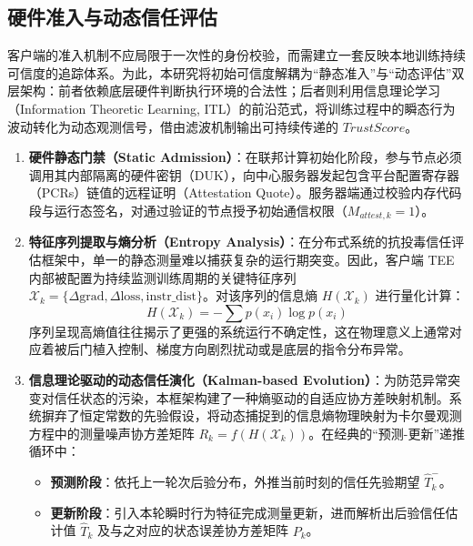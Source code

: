 \documentclass[11pt, a4paper, UTF8, fontset=fandol]{ctexart}
\begin{document}
\subsection{硬件准入与动态信任评估}
客户端的准入机制不应局限于一次性的身份校验，而需建立一套反映本地训练持续可信度的追踪体系。为此，本研究将初始可信度解耦为“静态准入”与“动态评估”双层架构：前者依赖底层硬件判断执行环境的合法性；后者则利用信息理论学习（Information Theoretic Learning, ITL）的前沿范式\cite{chen2017maximum}，将训练过程中的瞬态行为波动转化为动态观测信号，借由滤波机制输出可持续传递的 $TrustScore$。

\begin{enumerate}
    \item \textbf{硬件静态门禁（Static Admission）}：在联邦计算初始化阶段，参与节点必须调用其内部隔离的硬件密钥（DUK），向中心服务器发起包含平台配置寄存器（PCRs）链值的远程证明（Attestation Quote）。服务器端通过校验内存代码段与运行态签名，对通过验证的节点授予初始通信权限（$M_{attest,k}=1$）。
    \item \textbf{特征序列提取与熵分析（Entropy Analysis）}：在分布式系统的抗投毒信任评估框架中\cite{li2026multidimensional}，单一的静态测量难以捕获复杂的运行期突变。因此，客户端 TEE 内部被配置为持续监测训练周期的关键特征序列 $\mathcal{X}_k = \{ \Delta \text{grad}, \Delta \text{loss}, \text{instr\_dist} \}$。对该序列的信息熵 $H(\mathcal{X}_k)$ 进行量化计算：
          \begin{equation}
              H(\mathcal{X}_k) = -\sum p(x_i) \log p(x_i)
          \end{equation}
          序列呈现高熵值往往揭示了更强的系统运行不确定性，这在物理意义上通常对应着被后门植入控制、梯度方向剧烈扰动或是底层的指令分布异常。
    \item \textbf{信息理论驱动的动态信任演化（Kalman-based Evolution）}：为防范异常突变对信任状态的污染，本框架构建了一种熵驱动的自适应协方差映射机制。系统摒弃了恒定常数的先验假设，将动态捕捉到的信息熵物理映射为卡尔曼观测方程中的测量噪声协方差矩阵 $R_k = f(H(\mathcal{X}_k))$。在经典的“预测-更新”递推循环中：
          \begin{itemize}
              \item \textbf{预测阶段}：依托上一轮次后验分布，外推当前时刻的信任先验期望 $\hat{T}_k^-$。
              \item \textbf{更新阶段}：引入本轮瞬时行为特征完成测量更新，进而解析出后验信任估计值 $\hat{T}_k$ 及与之对应的状态误差协方差矩阵 $P_k$。
          \end{itemize}
\end{enumerate}
\end{document}
